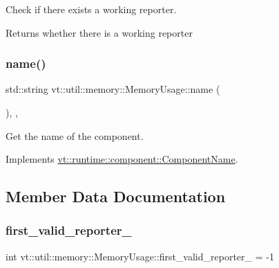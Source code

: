 Check if there exists a working reporter. 

\begin{DoxyReturn}{Returns}
whether there is a working reporter 
\end{DoxyReturn}
\mbox{\label{structvt_1_1util_1_1memory_1_1_memory_usage_abd58d8e05874fa3da64e15fef0b9e87f}} 
\subsubsection{\texorpdfstring{name()}{name()}}
{\footnotesize\ttfamily std\+::string vt\+::util\+::memory\+::\+Memory\+Usage\+::name (\begin{DoxyParamCaption}{ }\end{DoxyParamCaption})\hspace{0.3cm}{\ttfamily [inline]}, {\ttfamily [override]}, {\ttfamily [virtual]}}



Get the name of the component. 



Implements \hyperlink{structvt_1_1runtime_1_1component_1_1_component_name_a33c06229bb605a2b2ceff68830d6d773}{vt\+::runtime\+::component\+::\+Component\+Name}.



\subsection{Member Data Documentation}
\mbox{\label{structvt_1_1util_1_1memory_1_1_memory_usage_a714d3de79740091fce1761c7c0a858bd}} 
\subsubsection{\texorpdfstring{first\+\_\+valid\+\_\+reporter\+\_\+}{first\_valid\_reporter\_}}
{\footnotesize\ttfamily int vt\+::util\+::memory\+::\+Memory\+Usage\+::first\+\_\+valid\+\_\+reporter\+\_\+ = -\/1\hspace{0.3cm}{\ttfamily [private]}}

